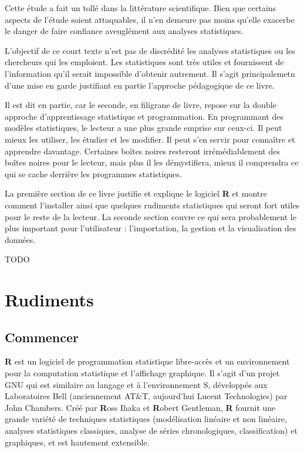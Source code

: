 \documentclass[
]{book}
\begin{document}
Cette étude a fait un tollé dans la littérature scientifique. Bien que certains aspects de l'étude soient attaquables, il n'en demeure pas moins qu'elle exacerbe le danger de faire confiance aveuglément aux analyses statistiques.

L'objectif de ce court texte n'est pas de discrédité les analyses statistiques ou les chercheurs qui les emploient. Les statistiques sont très utiles et fournissent de l'information qu'il serait impossible d'obtenir autrement. Il s'agit principalemetn d'une mise en garde justifiant en partie l'approche pédagogique de ce livre.

Il est dit en partie, car le seconde, en filigrane de livre, repose sur la double approche d'apprentissage statistique et programmation. En programmant des modèles statistiques, le lecteur a une plus grande emprise sur ceux-ci. Il peut mieux les utiliser, les étudier et les modifier. Il peut s'en servir pour connaître et apprendre davantage. Certaines boîtes noires resteront irrémédiablement des boîtes noires pour le lecteur, mais plus il les démystifiera, mieux il comprendra ce qui se cache derrière les programmes statistiques.

La première section de ce livre justifie et explique le logiciel \textbf{R} et montre comment l'installer ainsi que quelques rudiments statistiques qui seront fort utiles pour le reste de la lecteur. La seconde section couvre ce qui sera probablement le plus important pour l'utilisateur : l'importation, la gestion et la visualisation des données.

TODO

\hypertarget{part-rudiments}{%
\part{Rudiments}\label{part-rudiments}}

\hypertarget{commencer}{%
\chapter{Commencer}\label{commencer}}

\textbf{R} \autocite{R-base} est un logiciel de programmation statistique libre-accès et un environnement pour la computation statistique et l'affichage graphique. Il s'agit d'un projet GNU qui est similaire au langage et à l'environnement S, développés aux Laboratoires Bell (anciennement AT\&T, aujourd'hui Lucent Technologies) par John Chambers. Créé par \textbf{R}oss Ihaka et \textbf{R}obert Gentleman, \textbf{R} fournit une grande variété de techniques statistiques (modélisation linéaire et non linéaire, analyses statistiques classiques, analyse de séries chronologiques, classification) et graphiques, et est hautement extensible.
\end{document}
